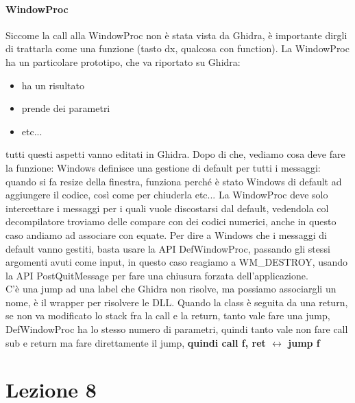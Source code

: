 \documentclass[12pt, oneside]{extbook}
\begin{document}
\subsubsection{WindowProc}
Siccome la call alla WindowProc non è stata vista da Ghidra, è importante dirgli di trattarla come una funzione (tasto dx, qualcosa con function). La WindowProc ha un particolare prototipo, che va riportato su Ghidra:
\begin{itemize}
\item ha un risultato
\item prende dei parametri
\item etc...
\end{itemize}
tutti questi aspetti vanno editati in Ghidra. Dopo di che, vediamo cosa deve fare la funzione: Windows definisce una gestione di default per tutti i messaggi: quando si fa resize della finestra, funziona perché è stato Windows di default ad aggiungere il codice, così come per chiuderla etc...
La WindowProc deve solo intercettare i messaggi per i quali vuole discostarsi dal default, vedendola col decompilatore troviamo delle compare con dei codici numerici, anche in questo caso andiamo ad associare con equate. Per dire a Windows che i messaggi di default vanno gestiti, basta usare la API DefWindowProc, passando gli stessi argomenti avuti come input, in questo caso reagiamo a WM\_DESTROY, usando la API PostQuitMessage per fare una chiusura forzata dell'applicazione.\\ C'è una jump ad una label che Ghidra non risolve, ma possiamo associargli un nome, è il wrapper per risolvere le DLL. Quando la class è seguita da una return, se non va modificato lo stack fra la call e la return, tanto vale fare una jump, DefWindowProc ha lo stesso numero di parametri, quindi tanto vale non fare call sub e return ma fare direttamente il jump, \textbf{quindi \textsf{call f, ret} $\leftrightarrow$ jump f}
\chapter{Lezione 8}
\end{document}
